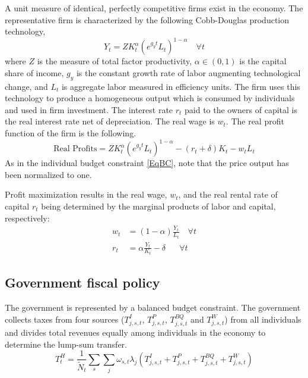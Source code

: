 \documentclass[letterpaper,12pt]{article}
\theoremstyle{definition}
\begin{document}
\begin{spacing}{1.5}
    A unit measure of identical, perfectly competitive firms exist in the economy. The representative firm is characterized by the following Cobb-Douglas production technology,
    \begin{equation}\label{EqCobbDougProd}
       Y_t = Z K_t^\alpha\left(e^{g_y t}L_t\right)^{1-\alpha} \quad \forall t
    \end{equation}
    where $Z$ is the measure of total factor productivity, $\alpha\in(0,1)$ is the capital share of income, $g_y$ is the constant growth rate of labor augmenting technological change, and $L_t$ is aggregate labor measured in efficiency units. The firm uses this technology to produce a homogeneous output which is consumed by individuals and used in firm investment.  The interest rate $r_t$ paid to the owners of capital is the real interest rate net of depreciation. The real wage is $w_t$.  The real profit function of the firm is the following.
    \begin{equation}\label{EqFirmProfit}
       \text{Real Profits} = Z K_t^\alpha\left(e^{g_y t}L_t\right)^{1-\alpha} - (r_t + \delta)K_t - w_t L_t
    \end{equation}
    As in the individual budget constraint \eqref{EqBC}, note that the price output has been normalized to one.

    Profit maximization results in the real wage, $w_t$, and the real rental rate of capital $r_t$ being determined by the marginal products of labor and capital, respectively:
    \begin{align}
       w_t &= (1-\alpha)\frac{Y_t}{L_t} \quad \forall t \label{EqFOCwage}\\
       r_t &= \alpha\frac{Y_t}{K_t} - \delta \quad\:\:\: \forall t \label{EqFOCrate}
    \end{align}


  \subsection{Government fiscal policy}\label{SecGovt}

    The government is represented by a balanced budget constraint. The government collects taxes from four sources ($T^I_{j,s,t}$, $T^P_{j,s,t}$, $T^{BQ}_{j,s,t}$ and $T^W_{j,s,t}$) from all individuals and divides total revenues equally among individuals in the economy to determine the lump-sum transfer.
    \begin{equation}\label{EqGovtBC}
      T^H_t = \frac{1}{\tilde N_t} \sum_s \sum_j \omega_{s,t}\lambda_j\left(T^I_{j,s,t} + T^P_{j,s,t} + T^{BQ}_{j,s,t} + T^W_{j,s,t}\right)
    \end{equation}


\end{spacing}
\end{document}
